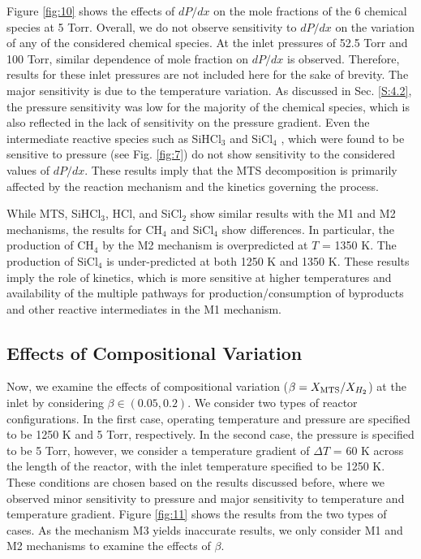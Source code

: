 \documentclass[final, letterpaper, square, comma, numbers, sort&compress]{elsarticle}
\begin{document}
Figure \ref{fig:10} shows the effects of $dP/dx$ on the mole fractions of the 6 chemical species at 5 Torr. Overall, we do not observe sensitivity to $dP/dx$ on the variation of any of the considered chemical species. At the inlet pressures of 52.5 Torr and 100 Torr, similar dependence of mole fraction on $dP/dx$ is observed. Therefore, results for these inlet pressures are not included here for the sake of brevity. The major sensitivity is due to the temperature variation. As discussed in Sec. \ref{S:4.2}, the pressure sensitivity was low for the majority of the chemical species, which is also reflected in the lack of sensitivity on the pressure gradient. Even the intermediate reactive species such as SiHCl$_3$ and SiCl$_4$ , which were found to be sensitive to pressure (see Fig. \ref{fig:7}) do not show sensitivity to the considered values of $dP/dx$. These results imply that the MTS decomposition is primarily affected by the reaction mechanism and the kinetics governing the process. 

While MTS, SiHCl$_3$, HCl, and SiCl$_2$ show similar results with the M1 and M2 mechanisms, the results for CH$_4$ and SiCl$_4$ show differences. In particular, the production of CH$_4$ by the M2 mechanism is overpredicted at $T$ = 1350 K. The production of SiCl$_4$ is under-predicted at both 1250 K and 1350 K. These results imply the role of kinetics, which is more sensitive at higher temperatures and availability of the multiple pathways for production/consumption of byproducts and other reactive intermediates in the M1 mechanism.

\subsection{Effects of Compositional Variation}
Now, we examine the effects of compositional variation ($\beta = X_{\rm MTS}/X_{H_2}$) at the inlet by considering $\beta \in (0.05,0.2)$. We consider two types of reactor configurations. In the first case, operating temperature and pressure are specified to be 1250 K and 5 Torr, respectively. In the second case, the pressure is specified to be 5 Torr, however, we consider a temperature gradient of $\Delta T$ = 60 K across the length of the reactor, with the inlet temperature specified to be 1250 K. These conditions are chosen based on the results discussed before, where we observed minor sensitivity to pressure and major sensitivity to temperature and temperature gradient. Figure \ref{fig:11} shows the results from the two types of cases. As the mechanism M3 yields inaccurate results, we only consider M1 and M2 mechanisms to examine the effects of $\beta$.
\end{document}

